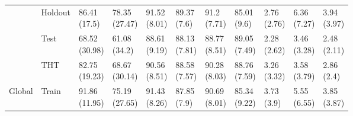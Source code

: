 \begin{table}
\begin{tabular}{lllllllllll}
       & Holdout &   \makecell{86.41\\(17.5)} &  \makecell{78.35\\(27.47)} &   \makecell{91.52\\(8.01)} &   \makecell{89.37\\(7.6)} &   \makecell{91.2\\(7.71)} &   \makecell{85.01\\(9.6)} &      \makecell{2.76\\(2.76)} &  \makecell{6.36\\(7.27)} &  \makecell{3.94\\(3.97)} \\
       & Test &  \makecell{68.52\\(30.98)} &   \makecell{61.08\\(34.2)} &   \makecell{88.61\\(9.19)} &  \makecell{88.13\\(7.81)} &  \makecell{88.77\\(8.51)} &  \makecell{89.05\\(7.49)} &      \makecell{2.28\\(2.62)} &  \makecell{3.46\\(3.28)} &  \makecell{2.48\\(2.11)} \\
       & THT &  \makecell{82.75\\(19.23)} &  \makecell{68.67\\(30.14)} &   \makecell{90.56\\(8.51)} &  \makecell{88.58\\(7.57)} &  \makecell{90.28\\(8.03)} &  \makecell{88.76\\(7.59)} &      \makecell{3.26\\(3.32)} &  \makecell{3.58\\(3.79)} &   \makecell{2.86\\(2.4)} \\
Global & Train &  \makecell{91.86\\(11.95)} &  \makecell{75.19\\(27.65)} &   \makecell{91.43\\(8.26)} &   \makecell{87.85\\(7.9)} &  \makecell{90.69\\(8.01)} &  \makecell{85.34\\(9.22)} &       \makecell{3.73\\(3.9)} &  \makecell{5.55\\(6.55)} &  \makecell{3.85\\(3.87)} \\

\end{tabular}
\end{table}
